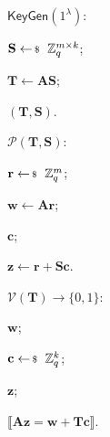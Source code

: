 \documentclass[../../book.tex]{subfiles}
\begin{document}
\begin{algoproto}[ht]
    \small
    \centering
    \setlength{\fboxsep}{1.5pt}
    \begin{mdframed}[linecolor=black, linewidth=1pt,
                     skipabove=10pt, skipbelow=10pt,
                     innerleftmargin=5pt, innerrightmargin=5pt]
        \begin{minipage}[t]{0.26\linewidth}
            \colorbox{oc-blue-1}{$\mathsf{KeyGen}(1^{\lambda})$:}
            \begin{algoen}
                \item \colorbox{oc-orange-1}{$\mathbf{S} \leftarrowS \mathbb{Z}_q^{m \times k}$};
                \item \colorbox{oc-orange-1}{$\mathbf{T} \gets \mathbf{A}\mathbf{S}$};
                \item {} $(\mathbf{T}, \mathbf{S})$.
            \end{algoen}
        \end{minipage}
        \hfill
        \begin{minipage}[t]{0.29\linewidth}
            \colorbox{oc-blue-1}{$\mathcal{P}(\mathbf{T}, \mathbf{S})$:}
            \begin{algoen}
                \item \colorbox{oc-orange-1}{$\mathbf{r} \leftarrowS \mathbb{Z}_q^m$};
                \item {} \colorbox{oc-orange-1}{$\mathbf{w} \gets \mathbf{A}\mathbf{r}$};
                \item {} $\mathbf{c}$;
                \item {} \colorbox{oc-orange-1}{$\mathbf{z} \gets \mathbf{r} + \mathbf{S}\mathbf{c}$}.
            \end{algoen}
        \end{minipage}
        \hfill
        \begin{minipage}[t]{0.38\linewidth}
            \colorbox{oc-blue-1}{$\mathcal{V}(\mathbf{T}) \to \{0,1\}$:}
            \begin{algoen}
                \item {} $\mathbf{w}$;
                \item {} \colorbox{oc-orange-1}{$\mathbf{c} \leftarrowS \mathbb{Z}_q^k$};
                \item {} $\mathbf{z}$;
                \item {} \colorbox{oc-orange-1}{$\llbracket \mathbf{A}\mathbf{z} = \mathbf{w} + \mathbf{T}\mathbf{c} \rrbracket$}.
            \end{algoen}
        \end{minipage}
    \end{mdframed}
    \caption{Attempt \#1: a direct translation of the Schnorr protocol. Changes compared to  are highlighted.}
    \label{fig:attempt-1}
\end{algoproto}
\end{document}
